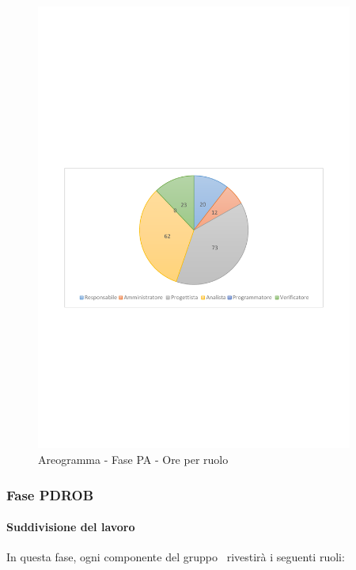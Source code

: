 \documentclass[../PianoProgetto.tex]{subfiles}
\begin{document}
	\begin{figure}[!h]
		\centering
		\includegraphics[width=0.93\textwidth , trim=2cm 9.5cm 2cm 11cm]{grafici/PA/PA-ore-ruolo}
			\caption{Areogramma - Fase PA - Ore per ruolo}
		\label{fig:CircleChart-fasePA_ore_r}
	\end{figure}	
\vfill	
	\subsubsection{Fase PDROB}
				\paragraph{Suddivisione del lavoro}
					In questa fase, ogni componente del gruppo \leaf\ rivestirà i seguenti ruoli:
	
\end{document}
